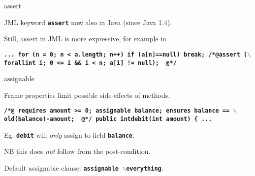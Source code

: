\documentclass[
pdf,
nocolorBG,
slideColor,
erik,
]{prosper}
\newcommand{\code}[1]{{\rm \texttt{\textbf{\small #1}}}}
\newcommand{\old}     {\(\backslash\)old}
\newcommand{\vooralle}{\(\backslash\)forall}
\newcommand{\everything}{\(\backslash\)everything}
\newcommand{\nothing}{\(\backslash\)nothing}
\begin{document}
\begin{slide}{assert}
\vspace*{-3ex}

JML keyword \code{assert} now also in Java (since Java 1.4).

\medskip

Still, assert in JML is more expressive, for example in

\begin{alltt}
\texttt{\textbf{\small  ...
  for (n = 0; n < a.length; n++) 
       if (a[n]==null) break;
{\green /*@}{\blue assert (\vooralle int i; 0 <= i && i < n; 
                            a[i] != null);                }
  {\green @*/} }}
\end{alltt} 



\end{slide}

\begin{slide}{assignable}
\vspace*{-3ex}

{\blue Frame properties} limit possible side-effects of methods.


\begin{alltt}
\texttt{\textbf{\small {\green /*@}   requires amount >= 0;
     {\blue assignable} balance;
         ensures balance == \old(balance)-amount;
{ \green  @*/}
  public int{\green debit}(int amount) \{ 
    ...
}}
\end{alltt}
Eg. \code{debit} will {\em only} assign to field \code{balance}.

NB this does {\em not} follow from the post-condition.

\medskip

Default assignable clause: \code{assignable \everything}.

\end{slide}


\end{document}
